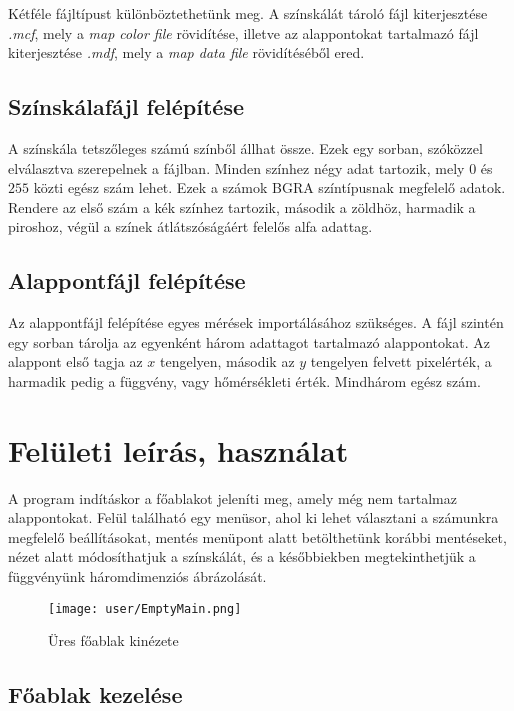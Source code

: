 		Kétféle fájltípust különböztethetünk meg. A színskálát tároló fájl kiterjesztése \textit{.mcf}, mely a \textit{map color file} rövidítése, illetve az alappontokat tartalmazó fájl kiterjesztése \textit{.mdf}, mely a \textit{map data file} rövidítéséből ered.
		
		\subsection{Színskálafájl  felépítése }
		
			A színskála tetszőleges számú színből állhat össze. Ezek egy sorban, szóközzel elválasztva szerepelnek a fájlban. Minden színhez négy adat tartozik, mely $0$ és $255$ közti egész szám lehet.  Ezek a számok BGRA színtípusnak megfelelő adatok. Rendere az első szám a kék színhez tartozik, második a zöldhöz, harmadik a piroshoz, végül a színek átlátszóságáért felelős alfa adattag.
			
		\subsection{Alappontfájl  felépítése }
			
			Az alappontfájl felépítése egyes mérések importálásához szükséges. A fájl szintén egy sorban tárolja az egyenként három adattagot tartalmazó alappontokat. Az alappont első tagja az $x$ tengelyen, második az $y$ tengelyen felvett pixelérték, a harmadik pedig a függvény, vagy hőmérsékleti érték. Mindhárom egész szám.
	
	\section{Felületi leírás, használat}
		
		A program indításkor a főablakot jeleníti meg, amely még nem  tartalmaz alappontokat. Felül található egy menüsor, ahol ki lehet választani a számunkra megfelelő beállításokat, mentés menüpont alatt betölthetünk korábbi mentéseket, nézet alatt módosíthatjuk a színskálát, és a későbbiekben megtekinthetjük a függvényünk háromdimenziós ábrázolását. 
		\begin{figure}[ht]
			\centering
			\texttt{[image: user/EmptyMain.png]}
			\caption{Üres főablak kinézete}
		\end{figure}
		
		\subsection{Főablak kezelése}
		
